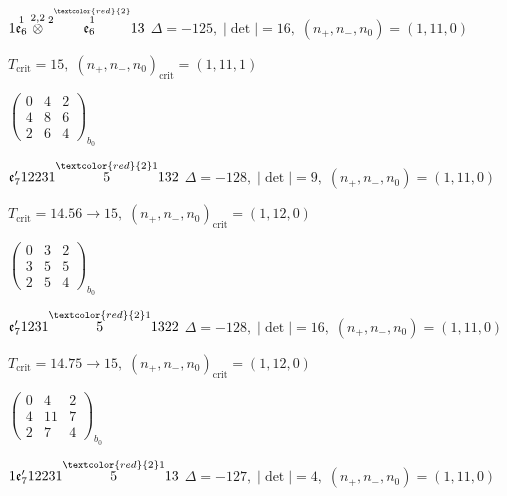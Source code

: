 \documentclass[10pt]{article}
\begin{document}
\smallskip

$1\overset{1}{\mathfrak{e}_6}\overset{2,2}{\otimes}\overset{2\overset{\textcolor{red}{2}}{1}}{\mathfrak{e}_6}13$ \quad $\Delta=-125,\; |\det|=16,\; (n_+,n_-,n_0)=(1,11,0)$

\hspace{1em}$T_{\text{crit}}=15,\; (n_+,n_-,n_0)_{\text{crit}}=(1,11,1)$

\hspace{2em}$\left(\begin{smallmatrix}0 & 4 & 2 \\ 4 & 8 & 6 \\ 2 & 6 & 4\end{smallmatrix}\right)_{\!b_0}$

\smallskip

$\mathfrak{e}_7'12231\overset{\textcolor{red}{2}1}{5}132$ \quad $\Delta=-128,\; |\det|=9,\; (n_+,n_-,n_0)=(1,11,0)$

\hspace{1em}$T_{\text{crit}}=14.56 \to 15,\; (n_+,n_-,n_0)_{\text{crit}}=(1,12,0)$

\hspace{2em}$\left(\begin{smallmatrix}0 & 3 & 2 \\ 3 & 5 & 5 \\ 2 & 5 & 4\end{smallmatrix}\right)_{\!b_0}$

\smallskip

$\mathfrak{e}_7'1231\overset{\textcolor{red}{2}1}{5}1322$ \quad $\Delta=-128,\; |\det|=16,\; (n_+,n_-,n_0)=(1,11,0)$

\hspace{1em}$T_{\text{crit}}=14.75 \to 15,\; (n_+,n_-,n_0)_{\text{crit}}=(1,12,0)$

\hspace{2em}$\left(\begin{smallmatrix}0 & 4 & 2 \\ 4 & 11 & 7 \\ 2 & 7 & 4\end{smallmatrix}\right)_{\!b_0}$

\smallskip

$1\mathfrak{e}_7'12231\overset{\textcolor{red}{2}1}{5}13$ \quad $\Delta=-127,\; |\det|=4,\; (n_+,n_-,n_0)=(1,11,0)$
\end{document}
